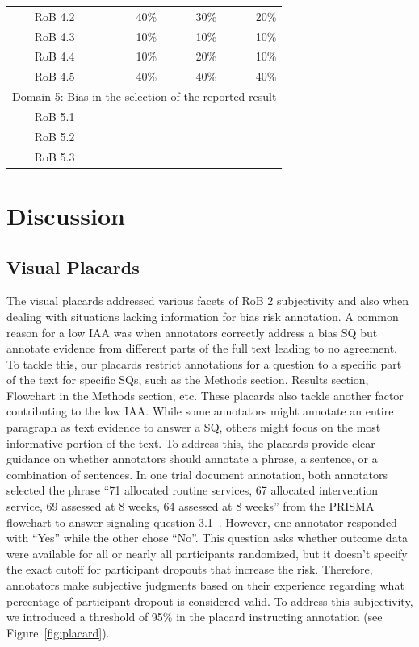 \documentclass[sn-mathphys,Numbered]{sn-jnl}%
\theoremstyle{thmstyleone}%
\theoremstyle{thmstyletwo}%
\theoremstyle{thmstylethree}%
\begin{document}
\begin{table}[htb]
\begin{tabular}{crrr}
        RoB 4.2 & 40\% & 30\% & 20\% \\ 
        RoB 4.3 & 10\% & 10\% & 10\% \\ 
        RoB 4.4 & 10\% & 20\% & 10\% \\ 
        RoB 4.5 & 40\% & 40\% & 40\% \\
        \hline
        \multicolumn{4}{c}{Domain 5: Bias in the selection of the reported result} \\
        \hline
        RoB 5.1 & & & \\ 
        RoB 5.2 & & & \\ 
        RoB 5.3 & & & \\
    \bottomrule[1.0pt]
    \end{tabular}
\end{table}
%
%
%
\section{Discussion}
\label{sec:discussion}
%
\subsection{Visual Placards}
\label{disc:placards}
%
The visual placards addressed various facets of RoB 2 subjectivity and also when dealing with situations lacking information for bias risk annotation.
A common reason for a low IAA was when annotators correctly address a bias SQ but annotate evidence from different parts of the full text leading to no agreement. 
To tackle this, our placards restrict annotations for a question to a specific part of the text for specific SQs, such as the Methods section, Results section, Flowchart in the Methods section, etc.
These placards also tackle another factor contributing to the low IAA.
While some annotators might annotate an entire paragraph as text evidence to answer a SQ, others might focus on the most informative portion of the text.
To address this, the placards provide clear guidance on whether annotators should annotate a phrase, a sentence, or a combination of sentences.
In one trial document annotation, both annotators selected the phrase ``71 allocated routine services, 67 allocated intervention service, 69 assessed at 8 weeks, 64 assessed at 8 weeks'' from the PRISMA flowchart to answer signaling question 3.1~\cite{gilbertson2000domiciliary}.
However, one annotator responded with ``Yes'' while the other chose ``No''.
This question asks whether outcome data were available for all or nearly all participants randomized, but it doesn't specify the exact cutoff for participant dropouts that increase the risk.
Therefore, annotators make subjective judgments based on their experience regarding what percentage of participant dropout is considered valid.
To address this subjectivity, we introduced a threshold of 95\% in the placard instructing annotation (see Figure~\ref{fig:placard}).
\end{document}
